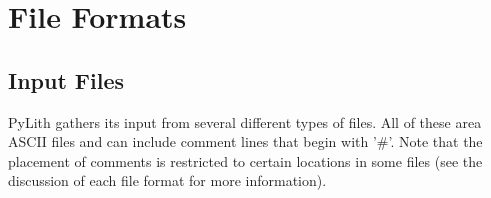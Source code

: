 \chapter{File Formats}

\section{Input Files}

PyLith gathers its input from several different types of files. All of
these area ASCII files and can include comment lines that begin with
'\#'. Note that the placement of comments is restricted to certain
locations in some files (see the discussion of each file format for
more information).














